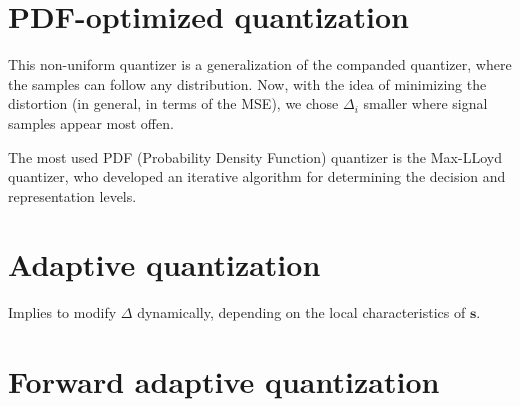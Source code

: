 \section{PDF-optimized quantization}

This non-uniform quantizer is a generalization of the companded
quantizer, where the samples can follow any distribution. Now, with
the idea of minimizing the distortion (in general, in terms of the
MSE), we chose $\Delta_i$ smaller where signal samples appear most
offen.

The most used PDF (Probability Density Function) quantizer is the
Max-LLoyd quantizer, who developed an iterative algorithm for
determining the decision and representation levels.



\section{Adaptive quantization}

Implies to modify $\Delta$ dynamically, depending on the local
characteristics of ${\mathbf s}$.


\section{Forward adaptive quantization}

